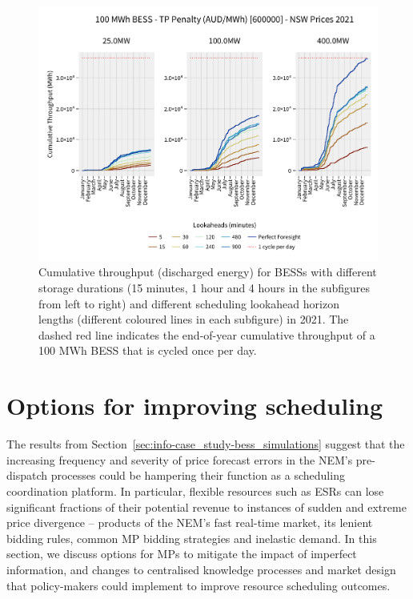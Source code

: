 \documentclass[12pt,a4paper,]{report}
\begin{document}
\begin{figure}
\hypertarget{fig:bess_throughputs}{%
\centering
\includegraphics{source/figures/NSW_100_arbitrage_throughputpenalty_no_degradation_600000_throughputs.pdf}
\caption[Cumulative throughput of BESSs with 15 minutes, 1 hour and 4
hours of storage throughout the simulated year (2021)]{Cumulative
throughput (discharged energy) for BESSs with different storage
durations (15 minutes, 1 hour and 4 hours in the subfigures from left to
right) and different scheduling lookahead horizon lengths (different
coloured lines in each subfigure) in 2021. The dashed red line indicates
the end-of-year cumulative throughput of a 100 MWh BESS that is cycled
once per day.}\label{fig:bess_throughputs}
}
\end{figure}

\hypertarget{sec:info-discussion}{%
\section{Options for improving scheduling}\label{sec:info-discussion}}

The results from Section~\ref{sec:info-case_study-bess_simulations}
suggest that the increasing frequency and severity of price forecast
errors in the NEM's pre-dispatch processes could be hampering their
function as a scheduling coordination platform. In particular, flexible
resources such as ESRs can lose significant fractions of their potential
revenue to instances of sudden and extreme price divergence -- products
of the NEM's fast real-time market, its lenient bidding rules, common MP
bidding strategies and inelastic demand. In this section, we discuss
options for MPs to mitigate the impact of imperfect information, and
changes to centralised knowledge processes and market design that
policy-makers could implement to improve resource scheduling outcomes.
\end{document}
